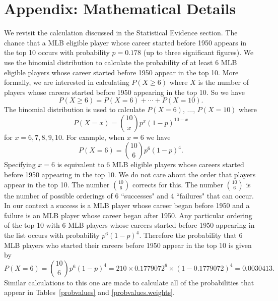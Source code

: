\documentclass[11pt]{article}\usepackage[]{graphicx}\usepackage[]{color}
\begin{document}
\section*{Appendix: Mathematical Details}

We revisit the calculation discussed in the Statistical Evidence section.  
The chance that a MLB eligible player whose career started before 1950 
appears in the top 10 occurs with probability $p = 0.178$ 
(up to three significant figures).  We use the binomial distribution to 
calculate the probability of at least 6 MLB eligible players whose career 
started before 1950 appear in the top 10.  More formally, we are interested in 
calculating $P(X \geq 6)$ where $X$ is the number of players whose careers 
started before 1950 appearing in the top 10.  So we have
$$  
  P(X \geq 6) = P(X = 6) + \cdots + P(X = 10). 
$$
The binomial distribution is used to calculate $P(X = 6)$, $\ldots$, 
$P(X = 10)$ where
$$  
  P(X = x) = {10 \choose x}p^x(1-p)^{10-x}
$$
for $x = 6,7,8,9,10$. For example, when $x = 6$ we have
$$  
  P(X = 6) = {10 \choose 6}p^6(1-p)^{4}. 
$$
Specifying $x = 6$ is equivalent to 6 MLB eligible players whose careers 
started before 1950 appearing in the top 10.  We do not care about the order 
that players appear in the top 10.  The number ${10 \choose 6}$ corrects for 
this. The number ${10 \choose 6}$ is the number of possible orderings of 6 
``successes" and 4 ``failures" that can occur.  In our context a success is a 
MLB player whose career began before 1950 and a failure is an 
MLB player whose career began after 1950.  Any particular ordering of the top 
10 with 6 MLB players whose careers started before 1950 appearing 
in the list occurs with probability $p^6(1-p)^4$. 
Therefore the probability that 6 MLB players who started their careers  
before 1950 appear in the top 10 is given by
$$  
  P(X = 6) = {10 \choose 6}p^6(1-p)^{4} 
    = 210 \times 0.1779072^6 \times (1 - 0.1779072)^4
    = 0.0030413. 
$$
Similar calculations to this one are made to calculate all of the 
probabilities that appear in Tables~\ref{probvalues} and 
\ref{probvalues.weights}.
\end{document}
